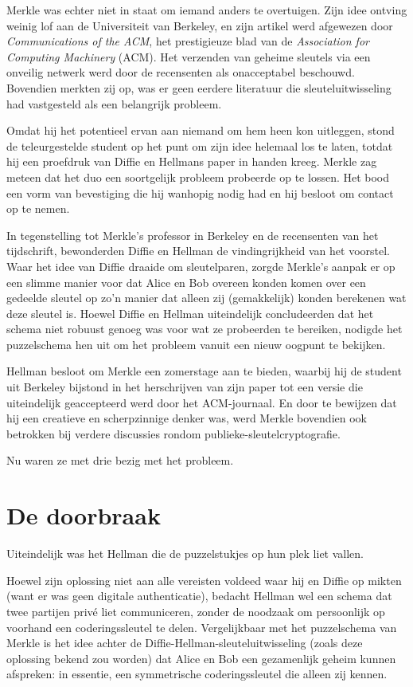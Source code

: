 \documentclass[
  a5paper,
  smalldemyvopaper,11pt,twoside,onecolumn,openright,extrafontsizes,
hidelinks]{memoir}
\begin{document}
Merkle was echter niet in staat om iemand anders te overtuigen. Zijn
idee ontving weinig lof aan de Universiteit van Berkeley, en zijn
artikel werd afgewezen door \emph{Communications of the ACM}, het
prestigieuze blad van de \emph{Association for Computing Machinery}
(ACM). Het verzenden van geheime sleutels via een onveilig netwerk werd
door de recensenten als onacceptabel beschouwd. Bovendien merkten zij
op, was er geen eerdere literatuur die sleuteluitwisseling had
vastgesteld als een belangrijk probleem.

Omdat hij het potentieel ervan aan niemand om hem heen kon uitleggen,
stond de teleurgestelde student op het punt om zijn idee helemaal los te
laten, totdat hij een proefdruk van Diffie en Hellmans paper in handen
kreeg. Merkle zag meteen dat het duo een soortgelijk probleem probeerde
op te lossen. Het bood een vorm van bevestiging die hij wanhopig nodig
had en hij besloot om contact op te nemen.

In tegenstelling tot Merkle's professor in Berkeley en de recensenten
van het tijdschrift, bewonderden Diffie en Hellman de vindingrijkheid
van het voorstel. Waar het idee van Diffie draaide om sleutelparen,
zorgde Merkle's aanpak er op een slimme manier voor dat Alice en Bob
overeen konden komen over een gedeelde sleutel op zo'n manier dat alleen
zij (gemakkelijk) konden berekenen wat deze sleutel is. Hoewel Diffie en
Hellman uiteindelijk concludeerden dat het schema niet robuust genoeg
was voor wat ze probeerden te bereiken, nodigde het puzzelschema hen uit
om het probleem vanuit een nieuw oogpunt te bekijken.

Hellman besloot om Merkle een zomerstage aan te bieden, waarbij hij de
student uit Berkeley bijstond in het herschrijven van zijn paper tot een
versie die uiteindelijk geaccepteerd werd door het ACM-journaal. En door
te bewijzen dat hij een creatieve en scherpzinnige denker was, werd
Merkle bovendien ook betrokken bij verdere discussies rondom
publieke-sleutelcryptografie.

Nu waren ze met drie bezig met het probleem.

\section{De doorbraak}\label{de-doorbraak}

Uiteindelijk was het Hellman die de puzzelstukjes op hun plek liet
vallen.

Hoewel zijn oplossing niet aan alle vereisten voldeed waar hij en Diffie
op mikten (want er was geen digitale authenticatie), bedacht Hellman wel
een schema dat twee partijen privé liet communiceren, zonder de noodzaak
om persoonlijk op voorhand een coderingssleutel te delen. Vergelijkbaar
met het puzzelschema van Merkle is het idee achter de
Diffie-Hellman-sleuteluitwisseling (zoals deze oplossing bekend zou
worden) dat Alice en Bob een gezamenlijk geheim kunnen afspreken: in
essentie, een symmetrische coderingssleutel die alleen zij kennen.
\end{document}
